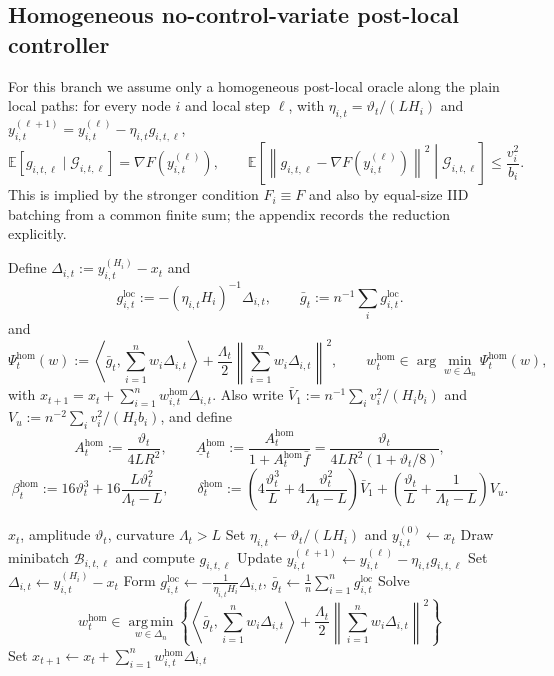 \documentclass{article}
\theoremstyle{definition}
\newcommand{\EE}{\mathbb E}
\newcommand{\cG}{\mathcal G}
\newcommand{\argmin}{\operatorname*{arg\,min}}
\newcommand{\norm}[1]{\left\lVert #1\right\rVert}
\newcommand{\ip}[2]{\left\langle #1,#2\right\rangle}
\begin{document}
\subsection{Homogeneous no-control-variate post-local controller}

For this branch we assume only a homogeneous post-local oracle along the plain local paths: for every node $i$ and local step $\ell$, with $\eta_{i,t}=\vartheta_t/(L H_i)$ and $y_{i,t}^{(\ell+1)}=y_{i,t}^{(\ell)}-\eta_{i,t}g_{i,t,\ell}$,
\begin{equation}
\EE[g_{i,t,\ell}\mid \cG_{i,t,\ell}]=\nabla F(y_{i,t}^{(\ell)}),\qquad \EE\!\left[\norm{g_{i,t,\ell}-\nabla F(y_{i,t}^{(\ell)})}^2\middle|\cG_{i,t,\ell}\right]\le \frac{v_i^2}{b_i}.
\label{eq:postlocal-hom-oracle-main}\end{equation}
This is implied by the stronger condition $F_i\equiv F$ and also by equal-size IID batching from a common finite sum; the appendix records the reduction explicitly.

Define $\Delta_{i,t}:=y_{i,t}^{(H_i)}-x_t$ and
\begin{equation}
g_{i,t}^{\mathrm{loc}}:=-(\eta_{i,t}H_i)^{-1}\Delta_{i,t},\qquad \bar g_t:=n^{-1}\sum_i g_{i,t}^{\mathrm{loc}}.
\label{eq:realized-hom-gbar}
\end{equation}
and
\[
\Psi_t^{\mathrm{hom}}(w):=\ip{\bar g_t}{\sum_{i=1}^n w_i\Delta_{i,t}}+\frac{\Lambda_t}{2}\norm{\sum_{i=1}^n w_i\Delta_{i,t}}^2,\qquad w_t^{\mathrm{hom}}\in\arg\min_{w\in\Delta_n}\Psi_t^{\mathrm{hom}}(w),
\]
with $x_{t+1}=x_t+\sum_{i=1}^n w_{i,t}^{\mathrm{hom}}\Delta_{i,t}$. Also write $\bar V_1:=n^{-1}\sum_i v_i^2/(H_i b_i)$ and $V_u:=n^{-2}\sum_i v_i^2/(H_i b_i)$, and define
\[
A_t^{\mathrm{hom}}:=\frac{\vartheta_t}{4LR^2},\qquad \underline A_t^{\mathrm{hom}}:=\frac{A_t^{\mathrm{hom}}}{1+A_t^{\mathrm{hom}}\bar f}=\frac{\vartheta_t}{4LR^2(1+\vartheta_t/8)},
\]
\[
\beta_t^{\mathrm{hom}}:=16\vartheta_t^3+16\frac{L\vartheta_t^2}{\Lambda_t-L},\qquad \delta_t^{\mathrm{hom}}:=\left(4\frac{\vartheta_t^3}{L}+4\frac{\vartheta_t^2}{\Lambda_t-L}\right)\bar V_1+\left(\frac{\vartheta_t}{L}+\frac{1}{\Lambda_t-L}\right)V_u.
\]
\begin{algorithm}[ht]
\caption{Homogeneous Post-local HEW-Local SGD}
\label{alg:realized-hom}
\begin{algorithmic}[1]
\Require $x_t$, amplitude $\vartheta_t$, curvature $\Lambda_t>L$
    \State Set $\eta_{i,t}\gets \vartheta_t/(L H_i)$ and $y_{i,t}^{(0)}\gets x_t$
        \State Draw minibatch $\mathcal B_{i,t,\ell}$ and compute $g_{i,t,\ell}$
        \State Update $y_{i,t}^{(\ell+1)}
        \gets
        y_{i,t}^{(\ell)}-\eta_{i,t}g_{i,t,\ell}$
    \EndFor
    \State Set $\Delta_{i,t}\gets y_{i,t}^{(H_i)}-x_t$
\EndFor
\State Form $g_{i,t}^{\mathrm{loc}}
\gets
-\frac{1}{\eta_{i,t}H_i}\Delta_{i,t}$,
$\bar g_t\gets \frac1n\sum_{i=1}^n g_{i,t}^{\mathrm{loc}}$
\State Solve
\[
w_t^{\mathrm{hom}}
\in
\argmin_{w\in\Delta_n}
\left\{
\ip{\bar g_t}{\sum_{i=1}^n w_i\Delta_{i,t}}
+\frac{\Lambda_t}{2}\norm{\sum_{i=1}^n w_i\Delta_{i,t}}^2
\right\}
\]
\State Set $x_{t+1}\gets x_t+\sum_{i=1}^n w_{i,t}^{\mathrm{hom}}\Delta_{i,t}$
\end{algorithmic}
\end{algorithm}
\end{document}
